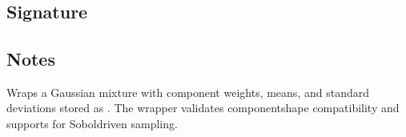 \documentclass[letterpaper,10pt,english]{sphinxmanual}
\begin{document}
\section{}
\label{\detokenize{object_api_reference:gaussianmixture}}

\subsection{Signature}
\label{\detokenize{object_api_reference:id67}}
\begin{sphinxVerbatim}[commandchars=\\\{\}]

\end{sphinxVerbatim}


\subsection{Notes}
\label{\detokenize{object_api_reference:id68}}
\sphinxAtStartPar
Wraps a Gaussian mixture with component weights, means, and standard deviations stored as . The wrapper validates component\sphinxhyphen{}shape compatibility and supports  for Sobol\sphinxhyphen{}driven sampling.
\end{document}
